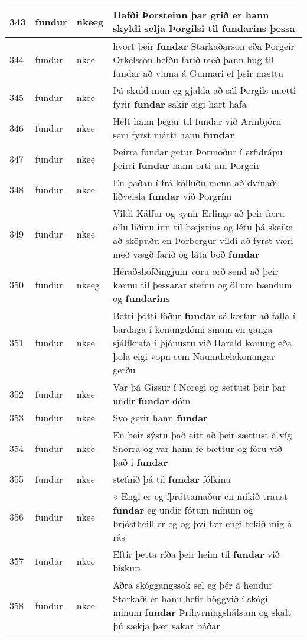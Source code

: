 \documentclass{article}
\begin{document}
\begin{longtable}{p{1cm}|p{1cm}|p{1cm}|p{13cm}}
\hline
343&fundur&nkeeg&Hafði Þorsteinn þar grið er hann skyldi selja Þorgilsi til \textbf{fundarins} þessa\\
\hline
344&fundur&nkee&hvort þeir \textbf{fundar} Starkaðarson eða Þorgeir Otkelsson hefðu farið með þann hug til fundar að vinna á Gunnari ef þeir mættu\\
\hline
345&fundur&nkee&Þá skuld mun eg gjalda að sál Þorgils mætti fyrir \textbf{fundar} sakir eigi hart hafa\\
\hline
346&fundur&nkee&Hélt hann þegar til fundar við Arinbjörn sem fyrst mátti hann \textbf{fundar} \\
\hline
347&fundur&nkee&Þeirra fundar getur Þormóður í erfidrápu þeirri \textbf{fundar} hann orti um Þorgeir\\
\hline
348&fundur&nkee&En þaðan í frá kölluðu menn að dvínaði liðveisla \textbf{fundar} við Þorgrím\\
\hline
349&fundur&nkee&Vildi Kálfur og synir Erlings að þeir færu öllu liðinu inn til bæjarins og létu þá skeika að sköpuðu en Þorbergur vildi að fyrst væri með vægð farið og láta boð \textbf{fundar} \\
\hline
350&fundur&nkeeg&Héraðshöfðingjum voru orð send að þeir kæmu til þessarar stefnu og öllum bændum og \textbf{fundarins} \\
\hline
351&fundur&nkee&Betri þótti föður \textbf{fundar} sá kostur að falla í bardaga í konungdómi sínum en ganga sjálfkrafa í þjónustu við Harald konung eða þola eigi vopn sem Naumdælakonungar gerðu\\
\hline
352&fundur&nkee&Var þá Gissur í Noregi og settust þeir þar undir \textbf{fundar} dóm\\
\hline
353&fundur&nkee&Svo gerir hann \textbf{fundar} \\
\hline
354&fundur&nkee&En þeir sýstu það eitt að þeir sættust á víg Snorra og var hann fé bættur og fóru við það í \textbf{fundar} \\
\hline
355&fundur&nkee&stefnið þá til \textbf{fundar} fólkinu\\
\hline
356&fundur&nkee&« Engi er eg íþróttamaður en mikið traust \textbf{fundar} eg undir fótum mínum og brjóstheill er eg og því fær engi tekið mig á rás\\
\hline
357&fundur&nkee&Eftir þetta ríða þeir heim til \textbf{fundar} við biskup\\
\hline
358&fundur&nkee&Aðra skóggangssök sel eg þér á hendur Starkaði er hann hefir höggvið í skógi mínum \textbf{fundar} Þríhyrningshálsum og skalt þú sækja þær sakar báðar\\

\end{longtable}
\end{document}
